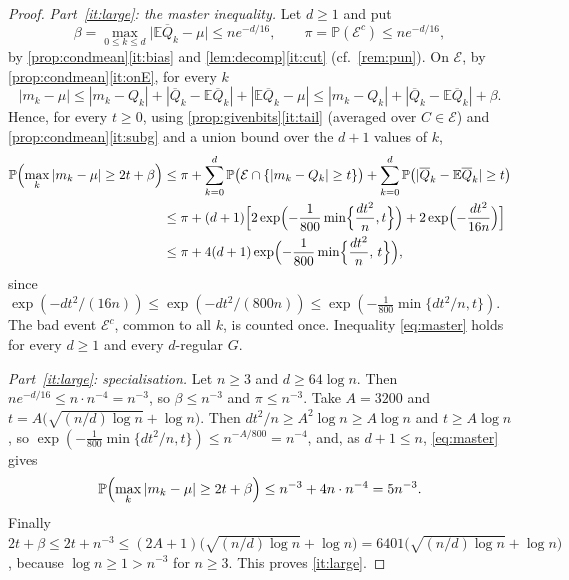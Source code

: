 \documentclass[11pt,a4paper]{article}
\theoremstyle{plain}
\theoremstyle{definition}
\theoremstyle{remark}
\newcommand{\EE}{\mathbb E}
\newcommand{\PP}{\mathbb P}
\newcommand{\cE}{\mathcal E}
\newcommand{\Qbar}{\overline Q}
\begin{document}
\label{pf:main}
\thmmain*
\begin{proof}
\emph{Part~\ref{it:large}: the master inequality.} Let $d\ge1$ and put
\[
 \beta=\max_{0\le k\le d}\bigl|\EE\Qbar_k-\mu\bigr|\le ne^{-d/16},\qquad \pi=\PP(\cE^c)\le ne^{-d/16},
\]
by \cref{prop:condmean}\ref{it:bias} and \cref{lem:decomp}\ref{it:cut} (cf.\ \cref{rem:pun}). On $\cE$, by \cref{prop:condmean}\ref{it:onE}, for every $k$
\[
 |m_k-\mu|\le|m_k-Q_k|+|\Qbar_k-\EE\Qbar_k|+|\EE\Qbar_k-\mu|\le|m_k-Q_k|+|\Qbar_k-\EE\Qbar_k|+\beta .
\]
Hence, for every $t\ge0$, using \cref{prop:givenbits}\ref{it:tail} (averaged over $C\in\cE$) and \cref{prop:condmean}\ref{it:subg} and a union bound over the $d+1$ values of $k$,
\begin{align}
 \PP\Bigl(\max_k|m_k-\mu|\ge2t+\beta\Bigr)
 &\le\pi+\sum_{k=0}^d\PP\bigl(\cE\cap\{|m_k-Q_k|\ge t\}\bigr)+\sum_{k=0}^d\PP\bigl(|\Qbar_k-\EE\Qbar_k|\ge t\bigr)\notag\\
 &\le\pi+(d+1)\Bigl[2\exp\Bigl(-\frac1{800}\min\Bigl\{\frac{dt^2}n,t\Bigr\}\Bigr)+2\exp\Bigl(-\frac{dt^2}{16n}\Bigr)\Bigr]\notag\\
 &\le\pi+4(d+1)\exp\Bigl(-\frac1{800}\min\Bigl\{\frac{dt^2}n,\,t\Bigr\}\Bigr),\label{eq:master}
\end{align}
since $\exp(-dt^2/(16n))\le\exp(-dt^2/(800n))\le\exp(-\tfrac1{800}\min\{dt^2/n,t\})$. The bad event $\cE^c$, common to all $k$, is counted once. Inequality \eqref{eq:master} holds for every $d\ge1$ and every $d$-regular $G$.

\emph{Part~\ref{it:large}: specialisation.} Let $n\ge3$ and $d\ge64\log n$. Then $ne^{-d/16}\le n\cdot n^{-4}=n^{-3}$, so $\beta\le n^{-3}$ and $\pi\le n^{-3}$. Take $A=3200$ and $t=A\bigl(\sqrt{(n/d)\log n}+\log n\bigr)$. Then $dt^2/n\ge A^2\log n\ge A\log n$ and $t\ge A\log n$, so $\exp(-\tfrac1{800}\min\{dt^2/n,t\})\le n^{-A/800}=n^{-4}$, and, as $d+1\le n$, \eqref{eq:master} gives
\[
 \PP\Bigl(\max_k|m_k-\mu|\ge2t+\beta\Bigr)\le n^{-3}+4n\cdot n^{-4}=5n^{-3}.
\]
Finally $2t+\beta\le2t+n^{-3}\le(2A+1)\bigl(\sqrt{(n/d)\log n}+\log n\bigr)=6401\bigl(\sqrt{(n/d)\log n}+\log n\bigr)$, because $\log n\ge1>n^{-3}$ for $n\ge3$. This proves \ref{it:large}.


\end{proof}
\end{document}
